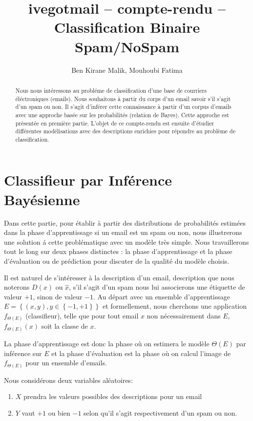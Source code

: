 \documentclass[a4paper, french]{article}
\title{ivegotmail -- compte-rendu --\\ Classification Binaire Spam/NoSpam}
\author{Ben Kirane Malik, Mouhoubi Fatima}
\begin{document}
\maketitle
\setlength{\parskip}{0.1in}
\setlength{\parindent}{15pt}

\begin{abstract}
Nous nous int\'eressons au probl\'eme de classification d'une base de courriers
\'el\'ectroniques (emails).
Nous souhaitons \`a partir du corps d'un email savoir s'il s'agit
d'un spam ou non. Il s'agit d'inf\'erer cette connaissance \`a partir
d'un corpus d'emails avec une approche bas\'ee sur les probabilit\'es
(relation de Bayes). Cette approche est  pr\'esent\'ee en premi\`ere partie.
L'objet de ce compte-rendu est ensuite d'\'etudier diff\'erentes mod\'elisations
avec des descriptions enrichies pour r\'epondre au probl\`eme de classification.
\end{abstract}

\tableofcontents

\section{Classifieur par Inf\'erence Bay\'esienne}
Dans cette partie, pour \'etablir  \`a partir des distributions de
probabilit\'es estim\'ees dans la phase d'apprentissage si un email est
un spam ou non, nous illustrerons une solution \'a cette probl\'ematique
avec un mod\`ele tr\`es simple.
Nous travaillerons tout le long sur deux phases distinctes :
la phase d'apprentissage et la phase d'\'evaluation ou de pr\'ediction pour
discuter de la qualit\'e du mod\`ele choisis.

Il est naturel de s'int\'eresser \`a la description d'un email, description que
nous noterons $D(x)$ ou $\hat{x}$, s'il s'agit d'un spam nous lui associerons
une \'etiquette de valeur $+1$, sinon de valeur $-1$.
Au d\'epart avec un ensemble d'apprentissage
$E=\left\{(x,y), y\in \left\{-1,+1\right\}\right\}$ et formellement,
nous cherchons une application $f_{\Theta(E)}$  (classifieur),
telle que pour tout email $x$ non n\'ecessairement dans $E$, $f_{\Theta(E)}(x)$
soit la classe de $x$.

La phase d'apprentissage est donc la phase o\`u on estimera le mod\`ele
$\Theta(E)$ par inf\'erence sur $E$ et la phase d'\'evaluation est la phase
o\`u on calcul l'image de $f_{\Theta(E)}$ pour un ensemble d'emails.

Nous consid\'erons deux variables al\'eatoires:
\begin{enumerate}
\item $X$ prendra les valeurs possibles des descriptions pour un email
\item $Y$ vaut $+1$ ou bien $-1$ selon qu'il s'agit respectivement
d'un spam ou non.
\end{enumerate}
\end{document}
